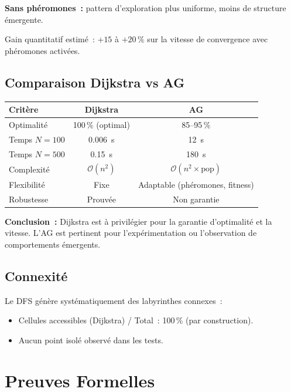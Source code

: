 \documentclass[12pt, a4paper]{article}
\theoremstyle{definition}
\theoremstyle{remark}
\newcommand{\bigO}[1]{\mathcal{O}\!\left(#1\right)}
\begin{document}
\textbf{Sans phéromones~:} pattern d'exploration plus uniforme, moins de structure
émergente.

Gain quantitatif estimé~: $+15$ à $+20$\,\% sur la vitesse de convergence avec
phéromones activées.

\subsection{Comparaison Dijkstra vs AG}

\begin{center}
\begin{tabularx}{\textwidth}{lCC}
    \toprule
    Critère & Dijkstra & AG \\
    \midrule
    Optimalité & 100\,\% (optimal) & 85–95\,\% \\
    Temps $N=100$ & 0.006~s & 12~s \\
    Temps $N=500$ & 0.15~s & 180~s \\
    Complexité & $\bigO{n^2}$ & $\bigO{n^2 \times \text{pop}}$ \\
    Flexibilité & Fixe & Adaptable (phéromones, fitness) \\
    Robustesse & Prouvée & Non garantie \\
    \bottomrule
\end{tabularx}
\end{center}

\textbf{Conclusion~:} Dijkstra est à privilégier pour la garantie d'optimalité et
la vitesse. L'AG est pertinent pour l'expérimentation ou l'observation de
comportements émergents.

\subsection{Connexité}

Le DFS génère systématiquement des labyrinthes connexes~:
\begin{itemize}[noitemsep]
    \item Cellules accessibles (Dijkstra) / Total~: 100\,\% (par construction).
    \item Aucun point isolé observé dans les tests.
\end{itemize}

\section{Preuves Formelles}
\end{document}
